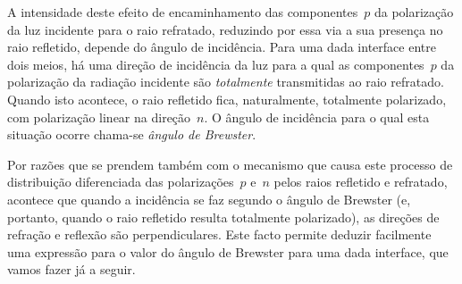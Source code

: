 A intensidade deste efeito de encaminhamento das componentes~$p$ da polarização
da luz incidente para o raio refratado, reduzindo por essa via a sua presença no
raio refletido, depende do ângulo de incidência. Para uma dada interface entre
dois meios, há uma direção de incidência da luz para a qual as componentes~$p$
da polarização da radiação incidente são \emph{totalmente} transmitidas ao raio
refratado. Quando isto acontece, o raio refletido fica, naturalmente, totalmente
polarizado, com polarização linear na direção~$n$. O ângulo de incidência para o
qual esta situação ocorre chama-se \emph{ângulo de Brewster}. 

Por razões que se prendem também com o mecanismo que causa este processo
de distribuição diferenciada das polarizações~$p$ e~$n$ pelos raios refletido e
refratado, acontece que quando a incidência se faz segundo o ângulo de Brewster
(e, portanto, quando o raio refletido resulta totalmente polarizado), as
direções de refração e reflexão são perpendiculares. Este facto permite deduzir
facilmente uma expressão para o valor do ângulo de Brewster para uma dada
interface, que vamos fazer já a seguir.

